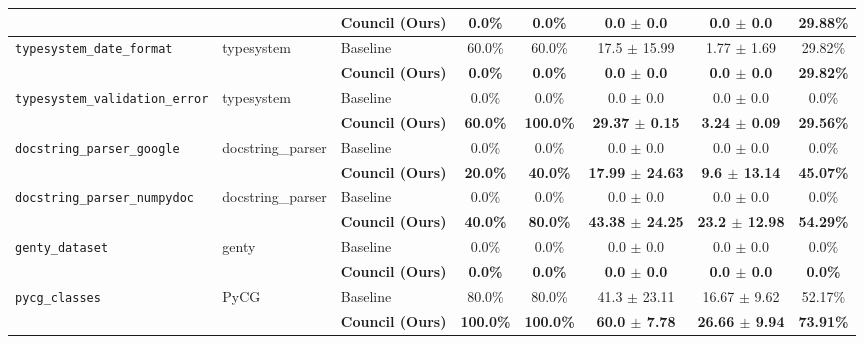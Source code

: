 \begin{table}[t]
\begin{tabular}{lll c c c c c}
 & & \textbf{Council (Ours)} & \textbf{0.0\%} & \textbf{0.0\%} & \textbf{0.0 $\pm$ 0.0} & \textbf{0.0 $\pm$ 0.0} & \textbf{29.88\%} \\
\midrule
\multirow{2}{*}{\texttt{typesystem_date_format}} & \multirow{2}{*}{typesystem} & Baseline & 60.0\% & 60.0\% & 17.5 $\pm$ 15.99 & 1.77 $\pm$ 1.69 & 29.82\% \\
 & & \textbf{Council (Ours)} & \textbf{0.0\%} & \textbf{0.0\%} & \textbf{0.0 $\pm$ 0.0} & \textbf{0.0 $\pm$ 0.0} & \textbf{29.82\%} \\
\midrule
\multirow{2}{*}{\texttt{typesystem_validation_error}} & \multirow{2}{*}{typesystem} & Baseline & 0.0\% & 0.0\% & 0.0 $\pm$ 0.0 & 0.0 $\pm$ 0.0 & 0.0\% \\
 & & \textbf{Council (Ours)} & \textbf{60.0\%} & \textbf{100.0\%} & \textbf{29.37 $\pm$ 0.15} & \textbf{3.24 $\pm$ 0.09} & \textbf{29.56\%} \\
\midrule
\multirow{2}{*}{\texttt{docstring_parser_google}} & \multirow{2}{*}{docstring_parser} & Baseline & 0.0\% & 0.0\% & 0.0 $\pm$ 0.0 & 0.0 $\pm$ 0.0 & 0.0\% \\
 & & \textbf{Council (Ours)} & \textbf{20.0\%} & \textbf{40.0\%} & \textbf{17.99 $\pm$ 24.63} & \textbf{9.6 $\pm$ 13.14} & \textbf{45.07\%} \\
\midrule
\multirow{2}{*}{\texttt{docstring_parser_numpydoc}} & \multirow{2}{*}{docstring_parser} & Baseline & 0.0\% & 0.0\% & 0.0 $\pm$ 0.0 & 0.0 $\pm$ 0.0 & 0.0\% \\
 & & \textbf{Council (Ours)} & \textbf{40.0\%} & \textbf{80.0\%} & \textbf{43.38 $\pm$ 24.25} & \textbf{23.2 $\pm$ 12.98} & \textbf{54.29\%} \\
\midrule
\multirow{2}{*}{\texttt{genty_dataset}} & \multirow{2}{*}{genty} & Baseline & 0.0\% & 0.0\% & 0.0 $\pm$ 0.0 & 0.0 $\pm$ 0.0 & 0.0\% \\
 & & \textbf{Council (Ours)} & \textbf{0.0\%} & \textbf{0.0\%} & \textbf{0.0 $\pm$ 0.0} & \textbf{0.0 $\pm$ 0.0} & \textbf{0.0\%} \\
\midrule
\multirow{2}{*}{\texttt{pycg_classes}} & \multirow{2}{*}{PyCG} & Baseline & 80.0\% & 80.0\% & 41.3 $\pm$ 23.11 & 16.67 $\pm$ 9.62 & 52.17\% \\
 & & \textbf{Council (Ours)} & \textbf{100.0\%} & \textbf{100.0\%} & \textbf{60.0 $\pm$ 7.78} & \textbf{26.66 $\pm$ 9.94} & \textbf{73.91\%} \\
\bottomrule
\end{tabular}
\end{table}